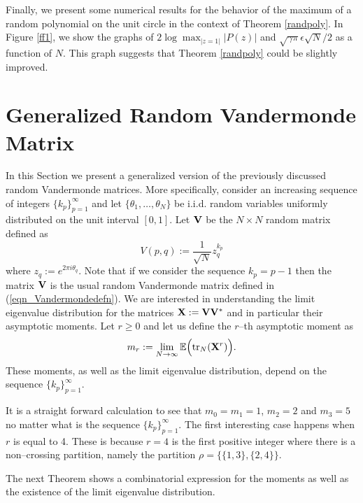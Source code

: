 \documentclass[smallextended]{svjour3}
\begin{document}
Finally, we present some numerical results for the behavior of the maximum of a random polynomial on the unit circle in the context of Theorem \ref{randpoly}. In Figure \ref{ff1}, we show the graphs of $2\log \max_{|z=1|}|P(z)|$ and $\sqrt{\gamma \pi}\epsilon\sqrt{N}/2$ as a function of $N$. This graph suggests that Theorem \ref{randpoly} could be slightly improved.

\section{Generalized Random Vandermonde Matrix}

In this Section we present a generalized version of the previously discussed random Vandermonde matrices. More specifically, consider an increasing sequence of integers $\{k_{p}\}_{p=1}^{\infty}$ and let $\{\theta_{1},\ldots,\theta_{N}\}$ be i.i.d. random variables uniformly distributed on the unit interval $[0,1]$. Let $\bf{V}$ be the $N\times N$ random matrix defined as
\begin{equation} 
V(p,q):=\frac{1}{\sqrt{N}}z_{q}^{k_p}
\end{equation} 
where $z_{q}:=e^{2\pi i\theta_{q}}$. Note that if we consider the sequence $k_p=p-1$ then the matrix $\bf{V}$ is the usual random Vandermonde matrix defined in  (\ref{eqn_Vandermondedefn}). We are interested in understanding the limit eigenvalue distribution for the matrices $\bf{X}:=\bf{V}\bf{V}^{*}$ and in particular their asymptotic moments. Let $r\geq 0$ and let us define the $r$--th asymptotic moment as 
\begin{equation}
m_{r}:=\lim_{N\to\infty} \mathbb{E}\Big( \mathrm{tr}_{N}({\bf X}^{r})\Big).
\end{equation}
These moments, as well as the limit eigenvalue distribution, depend on the sequence $\{k_{p}\}_{p=1}^{\infty}$. 

\begin{remark}
It is a straight forward calculation to see that $m_0=m_{1}=1$, $m_{2}=2$ and $m_3=5$ no matter what is the sequence $\{k_{p}\}_{p=1}^{\infty}$. The first interesting case happens when $r$ is equal to 4. These is because $r=4$ is the first positive integer where there is a non--crossing partition, namely the partition $\rho=\{\{1,3\},\{2,4\}\}$.
\end{remark}

The next Theorem shows a combinatorial expression for the moments as well as the existence of the limit eigenvalue distribution.
\end{document}
